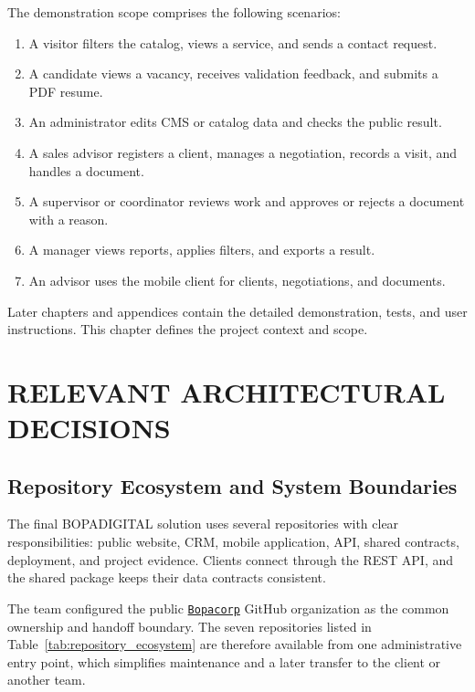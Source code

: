 \documentclass[letterpaper%
, oneside%
, 12pt%
, memoireprojet%
, english%
,creativecommons,hyperref, withAlgo2e %
]{thETS}
\begin{document}
The demonstration scope comprises the following scenarios:

\begin{enumerate}
    \item A visitor filters the catalog, views a service, and sends a contact request.
    \item A candidate views a vacancy, receives validation feedback, and submits a PDF resume.
    \item An administrator edits CMS or catalog data and checks the public result.
    \item A sales advisor registers a client, manages a negotiation, records a visit, and handles a document.
    \item A supervisor or coordinator reviews work and approves or rejects a document with a reason.
    \item A manager views reports, applies filters, and exports a result.
    \item An advisor uses the mobile client for clients, negotiations, and documents.
\end{enumerate}

Later chapters and appendices contain the detailed demonstration, tests, and user instructions. This chapter defines the project context and scope.

\chapter{RELEVANT ARCHITECTURAL DECISIONS}
\label{chap:architecture}

\section{Repository Ecosystem and System Boundaries}
The final BOPADIGITAL solution uses several repositories with clear responsibilities: public website, CRM, mobile application, API, shared contracts, deployment, and project evidence. Clients connect through the REST API, and the shared package keeps their data contracts consistent.

The team configured the public \href{https://github.com/Bopacorp}{\texttt{Bopacorp}} GitHub organization as the common ownership and handoff boundary. The seven repositories listed in Table~\ref{tab:repository_ecosystem} are therefore available from one administrative entry point, which simplifies maintenance and a later transfer to the client or another team.
\end{document}
